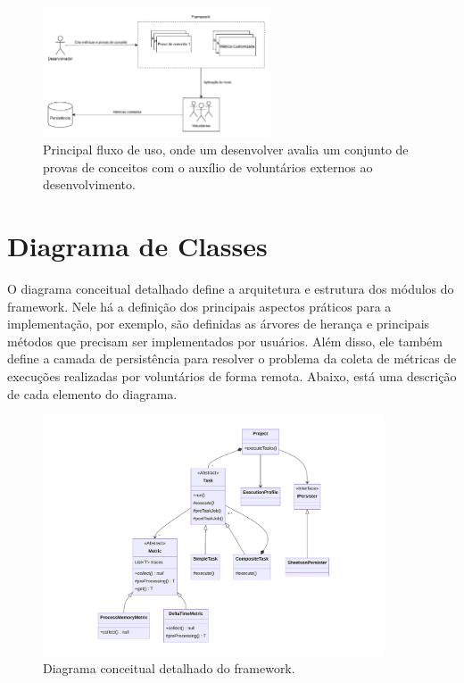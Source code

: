 \documentclass[12pt]{tcc}
\begin{document}
\begin{figure}[!ht]
	\centering
	\includegraphics[width=0.6\textwidth]{figures/diagrama-informal.pdf}
	\caption{Principal fluxo de uso, onde um desenvolver avalia um conjunto de provas de conceitos com o auxílio de voluntários externos ao desenvolvimento.}
	\label{fig:diagrama-informal}
\end{figure}

	
\section{Diagrama de Classes}
\label{cap:diagrama_de_classe}


O diagrama conceitual detalhado define a arquitetura e estrutura dos módulos do framework.
Nele há a definição dos principais aspectos práticos para a implementação, por exemplo, são definidas as árvores de herança e principais métodos que precisam ser implementados por usuários.
Além disso, ele também define a camada de persistência para resolver o problema da coleta de métricas de execuções realizadas por voluntários de forma remota.
Abaixo, está uma descrição de cada elemento do diagrama.

\begin{figure}[!ht]
	\centering
	\includegraphics[width=0.9\textwidth]{figures/diagrama-classes.pdf}
	\caption{Diagrama conceitual detalhado do framework.}
	\label{fig:diag-classes}
\end{figure}
\end{document}
